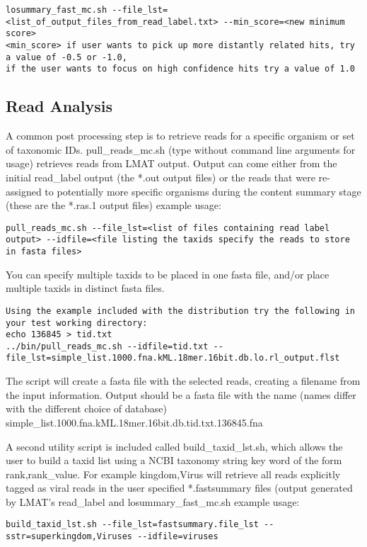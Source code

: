 \documentclass[11pt]{article}
\begin{document}
\begin{verbatim}
losummary_fast_mc.sh --file_lst=<list_of_output_files_from_read_label.txt> --min_score=<new minimum score>
<min_score> if user wants to pick up more distantly related hits, try a value of -0.5 or -1.0,
if the user wants to focus on high confidence hits try a value of 1.0

\end{verbatim}

\subsection{Read Analysis}
A common post processing step is to retrieve reads for a specific organism or set of taxonomic IDs.
pull\_reads\_mc.sh (type without command line arguments for usage) retrieves reads from LMAT output.
Output can come either from the initial read\_label output (the *.out output files) or the reads that
were re-assigned to potentially more specific organisms during the content summary stage (these are the *.ras.1 
output files)
example usage:
\begin{verbatim}
pull_reads_mc.sh --file_lst=<list of files containing read label output> --idfile=<file listing the taxids specify the reads to store in fasta files>
\end{verbatim}
You can specify multiple taxids to be placed in one fasta file, and/or place multiple taxids in distinct fasta files. 

\begin{verbatim}
Using the example included with the distribution try the following in your test working directory:
echo 136845 > tid.txt
../bin/pull_reads_mc.sh --idfile=tid.txt --file_lst=simple_list.1000.fna.kML.18mer.16bit.db.lo.rl_output.flst
\end{verbatim}

The script will create a fasta file with the selected reads, creating a filename from the input information. Output should be a fasta file with the name (names differ with the different choice of database)
simple_list.1000.fna.kML.18mer.16bit.db.tid.txt.136845.fna

A second utility script is included called {build_taxid_lst.sh}, which allows the user to build a taxid list using a NCBI taxonomy string key word of the form rank,rank_value.
For example kingdom,Virus will retrieve all reads explicitly tagged as viral reads in the user specified *.fastsummary files (output generated by LMAT's {read_label} and {losummary_fast_mc.sh}
example usage:
\begin{verbatim}
build_taxid_lst.sh --file_lst=fastsummary.file_lst --sstr=superkingdom,Viruses --idfile=viruses
\end{verbatim}
\end{document}

